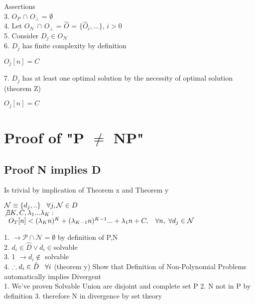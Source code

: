 \documentclass[11pt]{article}
\begin{document}
Assertions\\
3. $O_P$ $\cap$ $O_\perp$ = $\emptyset$\\
4. Let $O_\mathcal{N}$ $\cap$ $O_\perp$ = $\hat{O}$ = $\{\hat{O}_i,...\}$, $i > 0$\\
5. Consider $D_j \in O_\mathcal{N}$\\
6. $D_j$ has finite complexity by definition\\
\begin{center}
 $O_j[n] = C$
\end{center}
7. $D_j$ has at least one optimal solution by the necessity of optimal solution (theorem Z)
\begin{center}
 $O_j[n] = C$
\end{center}

































\newpage

\section{Proof of "P $\neq$ NP"}
\subsection{Proof N implies D}
Is trivial by implication of Theorem x and Theorem y
\begin{center}
$
\mathcal{N} \equiv \{ d_j,.. \} \hspace{3mm} \forall j, \mathcal{N} \in D
$
\\
$ 
\not \exists K,C,\lambda_1...\lambda_K : \hspace{2mm}
$
\\
$
\hspace{2mm} O_T[n] < (\lambda_K n)^K + (\lambda_{K-1} n)^{K-1}... + \lambda_1 n + C, \hspace{3mm} \forall n, \hspace{1mm} \forall d_j \in \mathcal{N}
$
\end{center}
1. $\rightarrow \mathcal{P} \cap \mathcal{N} = \emptyset$ by definition of P,N\\
2. $d_i \in \hat{D} \lor d_i \in $solvable\\
3. 1 $\rightarrow d_i \not \in$ solvable\\
4. $\therefore d_i \in \hat{D}\hspace{3mm} \forall i$ (theorem y)
Show that Definition of Non-Polynomial Problems automatically implies Divergent\\
1. We've proven Solvable Union are disjoint and complete set P
2. N not in P by definition
3. therefore N in divergence by set theory
\end{document}
